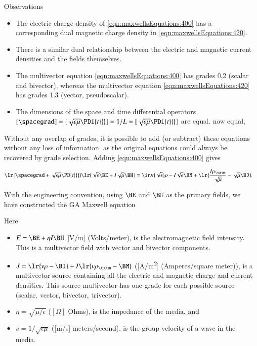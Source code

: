 Observations
\begin{itemize}
\item
The electric charge density of \cref{eqn:maxwellsEquations:400} has a corresponding dual magnetic charge density in \cref{eqn:maxwellsEquations:420}.
\item
There is a similar dual relationship between the electric and magnetic current densities and the fields themselves.
\item
The multivector equation \cref{eqn:maxwellsEquations:400} has grades 0,2 (scalar and bivector), whereas the multivector equation \cref{eqn:maxwellsEquations:420} has grades 1,3 (vector, pseudoscalar).
\item
The
dimensions of the space and time differential operators \( [\spacegrad] = [\sqrt{\epsilon\mu} \PDi{t}{}] = 1/L = [\sqrt{\epsilon\mu}\PDi{t}{}]\) are equal.
now equal,
\end{itemize}

Without any overlap of grades, it is possible to add (or subtract) these equations without any loss of information, as
the original equations could always be recovered by grade selection.
Adding \cref{eqn:maxwellsEquations:400} gives

\begin{dmath}\label{eqn:maxwellsEquations:440}
\lr{ \spacegrad + \sqrt{\epsilon\mu} \PD{t}{} }
\lr{ \sqrt{\epsilon} \BE
+
I \sqrt{\mu} \BH
}
=
\inv{\sqrt{\epsilon}} \rho
- I \sqrt{\epsilon} \BM
+\lr{
\frac{I \rho_\txtm}{\sqrt{\mu}}
- \sqrt{\mu} \BJ
}
.
\end{dmath}

With the engineering convention, using \( \BE \) and \( \BH \) as the primary fields, we have constructed the GA Maxwell equation


Here

\begin{itemize}
\item \( F = \BE + \eta I \BH \) [\si{V/m}] (Volts/meter), is the electromagnetic field intensity.
This is a multivector field with vector and bivector components.
\item \( J = \lr{ v \rho - \BJ } + I \lr{ v \rho_\txtm - \BM } \) ([\si{A/m^2}] (Amperes/square meter)),
is a multivector source containing all the electric and magnetic charge and current densities.
This source multivector has one grade for each possible source (scalar, vector, bivector, trivector).
\item \( \eta = \sqrt{\mu/\epsilon} \) (\( [\Omega] \) Ohms), is the impedance of the media, and
\item \( v = 1/\sqrt{\epsilon\mu} \) ([\si{m/s}] meters/second), is the group velocity of a wave in the media.
\end{itemize}

